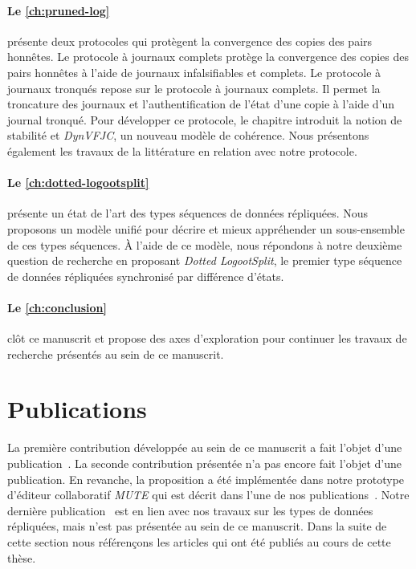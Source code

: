 \paragraph{Le \autoref{ch:pruned-log}} présente deux protocoles qui protègent la convergence des copies des pairs honnêtes.
Le protocole à journaux complets protège la convergence des copies des pairs honnêtes à l'aide de journaux infalsifiables et complets.
Le protocole à journaux tronqués repose sur le protocole à journaux complets.
Il permet la troncature des journaux et l'authentification de l'état d'une copie à l'aide d'un journal tronqué.
Pour développer ce protocole, le chapitre introduit la notion de stabilité et \emph{DynVFJC}, un nouveau modèle de cohérence.
Nous présentons également les travaux de la littérature en relation avec notre protocole.

\paragraph{Le \autoref{ch:dotted-logootsplit}} présente un état de l'art des types séquences de données répliquées.
Nous proposons un modèle unifié pour décrire et mieux appréhender un sous-ensemble de ces types séquences.
À l'aide de ce modèle, nous répondons à notre deuxième question de recherche en proposant \emph{Dotted LogootSplit}, le premier type séquence de données répliquées synchronisé par différence d'états.

\paragraph{Le \autoref{ch:conclusion}} clôt ce manuscrit et propose des axes d'exploration pour continuer les travaux de recherche présentés au sein de ce manuscrit.


\section{Publications}

La première contribution développée au sein de ce manuscrit a fait l'objet d'une publication~\autocite{2018_elvinger_prunable-auth-log}.
La seconde contribution présentée n'a pas encore fait l'objet d'une publication.
En revanche, la proposition a été implémentée dans notre prototype d'éditeur collaboratif \emph{MUTE} qui est décrit dans l'une de nos publications~\autocite{2017_nicolas-mute-demo}.
Notre dernière publication~\autocite{2019_yu_genericundo} est en lien avec nos travaux sur les types de données répliquées, mais n'est pas présentée au sein de ce manuscrit.
Dans la suite de cette section nous référençons les articles qui ont été publiés au cours de cette thèse.

